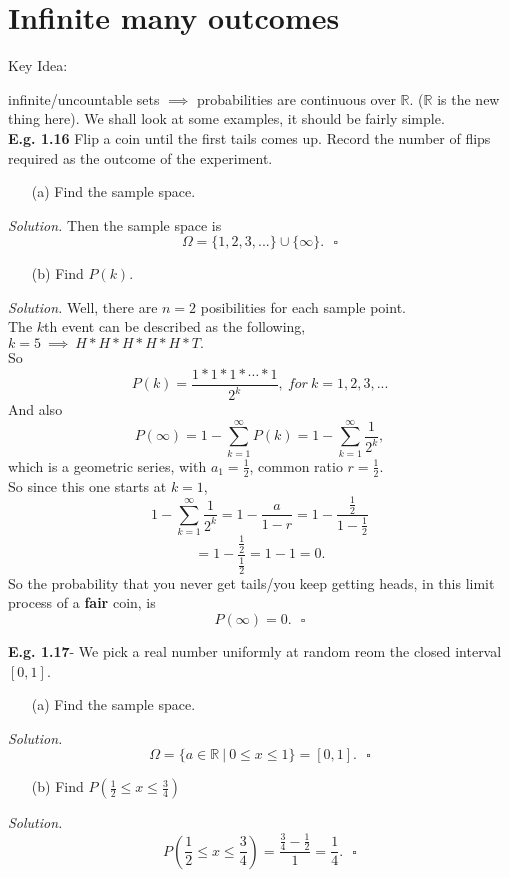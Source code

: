 \documentclass[12pt]{book}
\begin{document}
\section{Infinite many outcomes}
\hypertarget{infinitely many outcomes}{Key Idea:} infinite/uncountable sets $\implies{}$ probabilities are continuous over $\mathbb{R}$. ($\mathbb{R}$ is the new thing here). We shall look at some examples, it should be fairly simple.\\

\noindent \textbf{E.g. 1.16} Flip a coin until the first tails comes up. Record the number of flips required as the outcome of the experiment.\\
\begin{itemize} \item[(a)] Find the sample space.\end{itemize}
\textit{Solution.}
Then the sample space is  $$\Omega = \{1,2,3,...\}\cup \{\infty\}.~~~\square$$
\begin{itemize} \item[(b)] Find $P(k)$.\end{itemize}
\textit{Solution.}
Well, there are $n=2$ posibilities for each sample point.\\
The $k$th event can be described as the following,\\
$k=5 ~\implies~H*H*H*H*H*T.$\\
So $$P(k) = \frac{1*1*1*\cdots *1}{2^k}, ~for~k=1,2,3,...$$
And also 
$$P(\infty) = 1- \sum\limits_{k=1}^{\infty} P(k)= 1- \sum\limits_{k=1}^{\infty} \frac{1}{2^k},$$
which is a geometric series, with $a_1 = \frac{1}{2}$, common ratio $r=\frac{1}{2}$.\\
So since this one starts at $k=1$, 
$$1- \sum\limits_{k=1}^{\infty} \frac{1}{2^k} = 1-\frac{a}{1-r} = 1-\frac{\frac{1}{2}}{1-\frac{1}{2}}$$
$$=1-\frac{\frac{1}{2}}{\frac{1}{2}}=1-1 = 0.$$
So the probability that you never get tails/you keep getting heads, in this limit process of a \textbf{fair} coin, is 
$$P(\infty) = 0.~~~\square$$

\noindent \textbf{E.g. 1.17}- We pick a real number uniformly at random reom the closed interval $[0,1]$.\\
\begin{itemize} \item[(a)] Find the sample space. \end{itemize}
\textit{Solution.}
$$\Omega = \{a\in \mathbb{R} ~|~ 0\leq x \leq 1\} = [0,1].~~~\square$$
\begin{itemize} \item[(b)] Find $P\left(\frac{1}{2} \leq x \leq \frac{3}{4}\right)$\end{itemize}
\textit{Solution.}
$$P\left(\frac{1}{2} \leq x \leq \frac{3}{4}\right) = \frac{\frac{3}{4} - \frac{1}{2}}{1} = \frac{1}{4}.~~~\square$$
\end{document}
